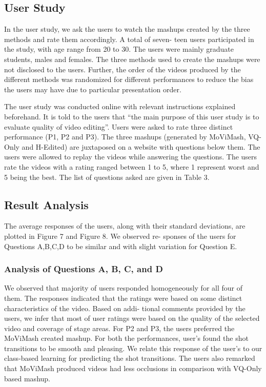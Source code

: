 \documentclass{sig-alternate}
\begin{document}
\subsection{User Study}

In the user study, we ask the users to watch the mashups created
by the three methods and rate them accordingly. A total of seven-
teen users participated in the study, with age range from 20 to 30.
The users were mainly graduate students, males and females. The
three methods used to create the mashups were not disclosed to the
users. Further, the order of the videos produced by the different
methods was randomized for different performances to reduce the
bias the users may have due to particular presentation order.

The user study was conducted online with relevant instructions
explained beforehand. It is told to the users that “the main purpose
of this user study is to evaluate quality of video editing”. Users
were asked to rate three distinct performance (P1, P2 and P3). The
three mashups (generated by MoViMash, VQ-Only and H-Edited)
are juxtaposed on a website with questions below them. The users were allowed to replay the videos while answering the questions.
The users rate the videos with a rating ranged between 1 to 5, where
1 represent worst and 5 being the best. The list of questions asked
are given in Table 3.

\subsection{Result Analysis}

The average responses of the users, along with their standard
deviations, are plotted in Figure 7 and Figure 8. We observed re-
sponses of the users for Questions A,B,C,D to be similar and with
slight variation for Question E.

\subsubsection{Analysis of Questions A, B, C, and D}
We observed that majority of users responded homogeneously
for all four of them. The responses indicated that the ratings were
based on some distinct characteristics of the video. Based on addi-
tional comments provided by the users, we infer that most of user
ratings were based on the quality of the selected video and coverage
of stage areas.
For P2 and P3, the users preferred the MoViMash created mashup.
For both the performances, user’s found the shot transitions to be
smooth and pleasing. We relate this response of the user’s to our
class-based learning for predicting the shot transitions. The users
also remarked that MoViMash produced videos had less occlusions
in comparison with VQ-Only based mashup.
\end{document}
